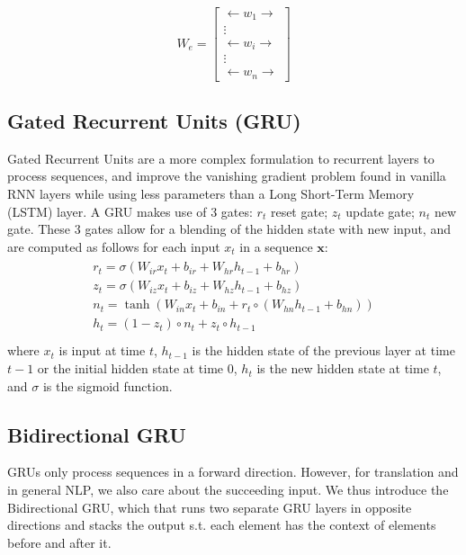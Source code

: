 \documentclass[twoside,twocolumn]{article}
\renewcommand{\vec}[1]{\mathbf{#1}}
\begin{document}
\begin{equation}
  W_e = \begin{bmatrix}
  \longleftarrow w_1 \longrightarrow \\
  \vdots\\
  \longleftarrow w_i \longrightarrow\\
  \vdots\\
  \longleftarrow w_n \longrightarrow
\end{bmatrix}
\end{equation}

\subsection{Gated Recurrent Units (GRU)}
\label{sec:gru}
Gated Recurrent Units are a more complex formulation to recurrent layers to process sequences, and improve the vanishing gradient problem found in vanilla RNN layers while using less parameters than a Long Short-Term Memory (LSTM) layer\cite{grupaper}. A GRU makes use of 3 gates: $r_t$ reset gate; $z_t$ update gate; $n_t$ new gate. These 3 gates allow for a blending of the hidden state with new input, and are computed as follows for each input $x_t$ in a sequence $\vec{x}$:
\begin{equation}
  \begin{split}\begin{array}{ll}
  r_t = \sigma(W_{ir} x_t + b_{ir} + W_{hr} h_{t-1} + b_{hr}) \\
  z_t = \sigma(W_{iz} x_t + b_{iz} + W_{hz} h_{t-1} + b_{hz}) \\
  n_t = \tanh(W_{in} x_t + b_{in} + r_t \circ (W_{hn} h_{t-1}+ b_{hn})) \\
  h_t = (1 - z_t) \circ n_t + z_t \circ h_{t-1} \\
  \end{array}\end{split}
\end{equation}
where $x_t$ is input at time $t$, $h_{t-1}$ is the hidden state of the previous layer at time $t-1$ or the initial hidden state at time $0$, $h_t$ is the new hidden state at time $t$, and $\sigma$ is the sigmoid function.
\subsection{Bidirectional GRU}
\label{sec:bidirectional}

GRUs only process sequences in a forward direction. However, for translation and in general NLP, we also care about the succeeding input. %
We thus introduce the Bidirectional GRU, which that runs two separate GRU layers in opposite directions and stacks the output s.t. each element has the context of elements before and after it.
\end{document}

